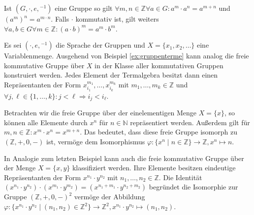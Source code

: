 \begin{remark}
    Ist $(G,\cdot,e,{}^{-1})$ eine Gruppe so gilt $\forall m,n\in\mathbb{Z}\forall a\in G:a^m\cdot a^n=a^{m+n}$ und $(a^m)^n=a^{m\cdot n}$.
    Falls $\cdot$ kommutativ ist, gilt weiters $\forall a,b\in G\forall m\in\mathbb{Z}:(a\cdot b)^m=a^m\cdot b^m$.
\end{remark}

\begin{example}
    Es sei $(\cdot,e,{}^{-1})$ die Sprache der Gruppen und $X=\{x_1,x_2,\ldots\}$ eine Variablenmenge.
    Ausgehend von Beispiel \ref{ex:gruppenterme} kann analog die freie kommutative Gruppe über $X$ in der Klasse
    aller kommutativen Gruppen konstruiert werden. Jedes Element der Termalgebra besitzt dann einen Repräsentanten
    der Form $x_{i_1}^{m_1},\ldots,x_{i_{k}}^{m_k}$ mit $m_1,\ldots,m_k\in \mathbb{Z}$ und $\forall j,\ell\in\{1,\ldots,k\}:j<\ell\Rightarrow i_j<i_\ell$.
\end{example}

\begin{example}
    Betrachten wir die freie Gruppe über der einelementigen Menge $X=\{x\}$, so können alle Elemente durch $x^n$ für
    $n\in\mathbb{N}$ repräsentiert werden. Außerdem gilt für $m,n\in\mathbb{Z}:x^m\cdot x^n=x^{m+n}$. Das bedeutet,
    dass diese freie Gruppe isomorph zu $(\mathbb{Z},+,0,-)$ ist, vermöge dem Isomorphismus $\varphi:\{x^n\mid n\in\mathbb{Z}\}\to \mathbb{Z},x^n\mapsto n$.
\end{example}

\begin{example}
    In Analogie zum letzten Beispiel kann auch die freie kommutative Gruppe über der Menge $X=\{x,y\}$ klassifiziert werden.
    Ihre Elemente besitzen eindeutige Repräsentanten der Form $x^{n_1}\cdot y^{n_2}$ mit $n_1,\ldots,n_2\in\mathbb{Z}$.
    Die Identität $(x^{n_1}\cdot y^{n_2})\cdot (x^{m_1}\cdot y^{m_2})=(x^{n_1+m_1}\cdot y^{n_2+m_2})$ begründet die Isomorphie
    zur Gruppe $(\mathbb{Z},+,0,-)^2$ vermöge der Abbildung $\varphi:\{x^{n_1}\cdot y^{n_2}\mid (n_1,n_2)\in\mathbb{Z}^2\}\to \mathbb{Z}^2,x^{n_1}\cdot y^{n_2}\mapsto (n_1,n_2)$.
\end{example}

